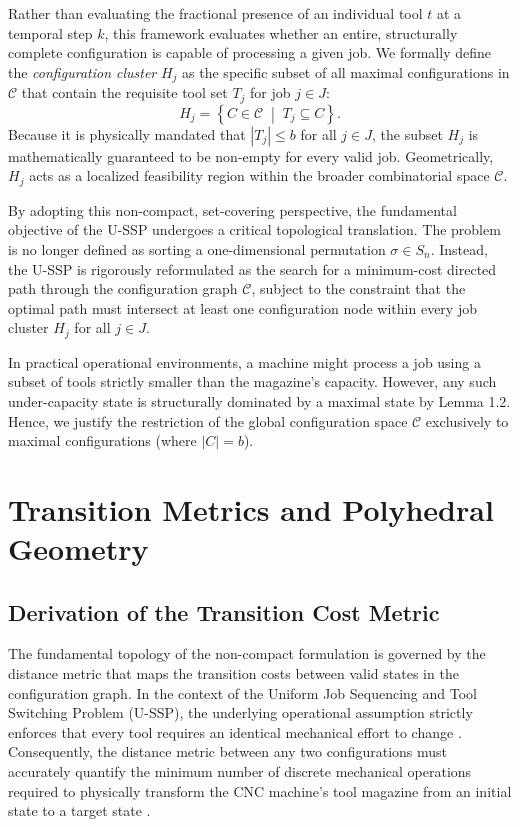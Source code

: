 \documentclass[11pt, a4paper]{book}
\begin{document}
	Rather than evaluating the fractional presence of an individual tool $t$ at a temporal step $k$, this framework evaluates whether an entire, structurally complete configuration is capable of processing a given job. We formally define the \textit{configuration cluster} $H_j$ as the specific subset of all maximal configurations in $\mathcal{C}$ that contain the requisite tool set $T_j$ for job $j \in J$:
	\begin{equation}
		H_j = \left\{ C \in \mathcal{C} \;\middle|\; T_j \subseteq C \right\}.
	\end{equation}
	Because it is physically mandated that $|T_j| \le b$ for all $j \in J$, the subset $H_j$ is mathematically guaranteed to be non-empty for every valid job. Geometrically, $H_j$ acts as a localized feasibility region within the broader combinatorial space $\mathcal{C}$.
	
	By adopting this non-compact, set-covering perspective, the fundamental objective of the U-SSP undergoes a critical topological translation. The problem is no longer defined as sorting a one-dimensional permutation $\sigma \in S_n$. Instead, the U-SSP is rigorously reformulated as the search for a minimum-cost directed path through the configuration graph $\mathcal{C}$, subject to the constraint that the optimal path must intersect at least one configuration node within every job cluster $H_j$ for all $j \in J$.

	In practical operational environments, a machine might process a job using a subset of tools strictly smaller than the magazine's capacity. However, any such under-capacity state is structurally dominated by a maximal state by Lemma 1.2. Hence, we justify the restriction of the global configuration space $\mathcal{C}$ exclusively to maximal configurations (where $|C| = b$).
	
	\section{Transition Metrics and Polyhedral Geometry}
	
	\subsection{Derivation of the Transition Cost Metric}
	
	The fundamental topology of the non-compact formulation is governed by the distance metric that maps the transition costs between valid states in the configuration graph. In the context of the Uniform Job Sequencing and Tool Switching Problem (U-SSP), the underlying operational assumption strictly enforces that every tool requires an identical mechanical effort to change \cite{Colares2026}. %
	Consequently, the distance metric between any two configurations must accurately quantify the minimum number of discrete mechanical operations required to physically transform the CNC machine's tool magazine from an initial state to a target state \cite{Colares2026}. %
	
\end{document}

